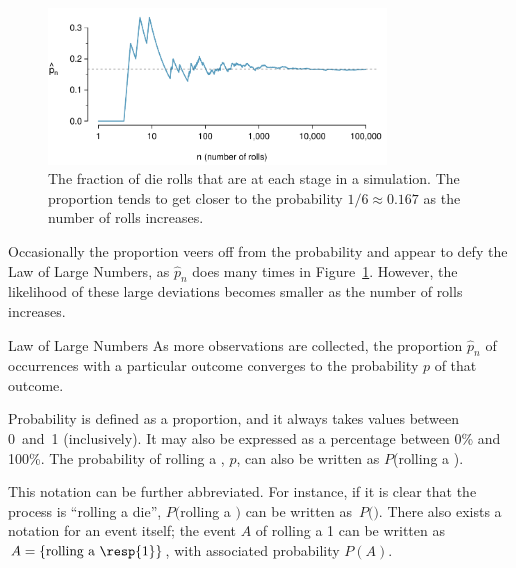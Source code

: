 \begin{figure}[h]
	\centering
	\includegraphics[width=0.8\textwidth]{ch_probability_oi_biostat/figures/dieProp/dieProp}
	\caption{The fraction of die rolls that are  at each stage in a simulation. The proportion tends to get closer to the probability $1/6 \approx 0.167$ as the number of rolls increases.}
	\label{fig:dieProp}
\end{figure}

Occasionally the proportion veers off from the probability and appear to defy the Law of Large Numbers, as $\hat{p}_n$ does many times in Figure~\ref{fig:dieProp}. However, the likelihood of these large deviations becomes smaller as the number of rolls increases.

\textD{\newpage}

\begin{onebox}{Law of Large Numbers}
As more observations are collected, the proportion $\hat{p}_n$ of occurrences with a particular outcome converges to the probability $p$ of that outcome.
\end{onebox}


Probability is defined as a proportion, and it always takes values between 0~and~1 (inclusively). It may also be expressed as a percentage between 0\% and 100\%. The probability of rolling a , $p$, can also be written as $P$(rolling a ).

This notation can be further abbreviated. For instance, if it is clear that the process is ``rolling a die'', $P($rolling a $)$ can be written as~$P($$)$.  There also exists a notation for an event itself; the event $A$ of rolling a 1 can be written as $A = \{\text{rolling a \resp{1}}\}$, with associated probability $P(A)$. 

